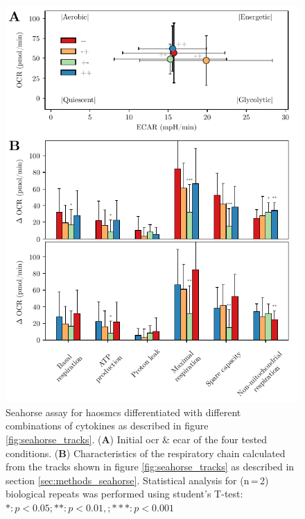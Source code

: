     \begin{figure}[h!]
    \capstart
        \centering
    	\includegraphics{Abbildung/Seahorse_summary_merged.pdf}

    	\begin{minipage}{\captionwidth}
    		\caption[energy_profile]{ \newline Seahorse assay for \acp{haosmc} differentiated with different combinations of cytokines as described in figure \ref{fig:seahorse_tracks}.
            (\textbf{A}) Initial \ac{ocr} \& \ac{ecar} of the four tested conditions. (\textbf{B}) Characteristics of the respiratory chain calculated from the tracks shown in figure \ref{fig:seahorse_tracks} as described in section \ref{sec:methods_seahorse}. Statistical analysis for (n\,=\,2) biological repeats was performed using student's T-test: $*: p < 0.05; **: p < 0.01, ; ***: p < 0.001$}
    		\label{fig:energy_profile}
    	\end{minipage}
    \end{figure}

